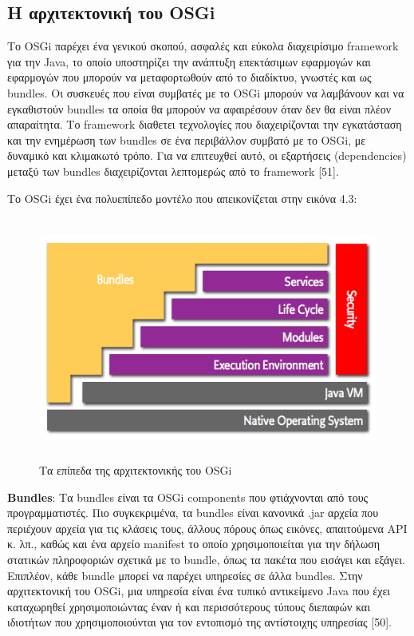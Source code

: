\subsection{Η αρχιτεκτονική του OSGi}
Το OSGi παρέχει ένα γενικού σκοπού, ασφαλές και εύκολα διαχειρίσιμο framework για την Java, το οποίο υποστηρίζει την ανάπτυξη επεκτάσιμων εφαρμογών και εφαρμογών που μπορούν να μεταφορτωθούν από το διαδίκτυο, γνωστές και ως bundles. Οι συσκευές που είναι συμβατές με το OSGi μπορούν να λαμβάνουν και να εγκαθιστούν bundles τα οποία θα μπορούν να αφαιρέσουν όταν δεν θα είναι πλέον απαραίτητα. Το framework διαθετει τεχνολογίες που διαχειρίζονται την εγκατάσταση και την ενημέρωση των bundles σε ένα περιβάλλον συμβατό με το OSGi, με δυναμικό και κλιμακωτό τρόπο. Για να επιτευχθεί αυτό, οι εξαρτήσεις (dependencies) μεταξύ των bundles διαχειρίζονται λεπτομερώς από το framework [51].  

	Το OSGi έχει ένα πολυεπίπεδο μοντέλο που απεικονίζεται στην εικόνα 4.3:
	

\begin{figure}[htbp]
	\centering
		\includegraphics[height=8cm,width=14cm]{Figures/9.png}
	\caption{Τα επίπεδα της αρχιτεκτονικής του OSGi  \cite{OSGi} }	
\end{figure}

\textbf{Bundles}: Τα bundles είναι τα OSGi components που φτιάχνονται από τους προγραμματιστές. Πιο συγκεκριμένα, τα bundles είναι κανονικά .jar αρχεία που περιέχουν αρχεία για τις κλάσεις τους, άλλους πόρους όπως εικόνες, απαιτούμενα API κ. λπ., καθώς και ένα αρχείο manifest το οποίο χρησιμοποιείται για την δήλωση στατικών πληροφοριών σχετικά με το bundle, όπως τα πακέτα που εισάγει και εξάγει. Επιπλέον, κάθε bundle μπορεί να παρέχει υπηρεσίες σε άλλα bundles. Στην αρχιτεκτονική του OSGi, μια υπηρεσία είναι ένα τυπικό αντικείμενο Java που έχει καταχωρηθεί χρησιμοποιώντας έναν ή και περισσότερους τύπους διεπαφών και ιδιοτήτων που χρησιμοποιούνται για τον εντοπισμό της αντίστοιχης υπηρεσίας [50].

